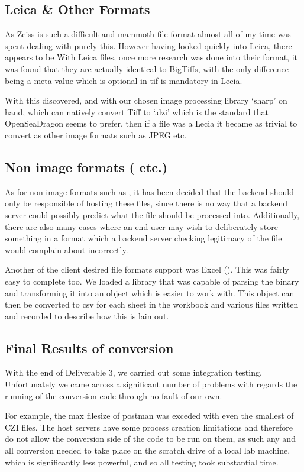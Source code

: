 \subsection{Leica \& Other Formats}
As Zeiss is such a difficult and mammoth file format almost all of my time was spent dealing with purely this.
However having looked quickly into Leica, there appears to be
With Leica files, once more research was done into their format, it was found that they are actually identical
to BigTiffs, with the only difference being a meta value which is optional in tif is mandatory in Lecia.

With this discovered, and with our chosen image processing library `sharp' on hand, which can natively convert Tiff to
`.dzi' which is the standard that OpenSeaDragon seems to prefer, then if a file was a Lecia it became as trivial to convert
as other image formats such as JPEG etc.

\subsection{Non image formats ( etc.)}
As for non image formats such as , it has been decided that the backend should only be responsible of hosting these
files, since there is no way that a backend server could possibly predict what the file should be processed into.
Additionally, there are also many cases where an end-user may wish to deliberately store something in a format
which a backend server checking legitimacy of the file would complain about incorrectly.

Another of the client desired file formats support was Excel (). This was fairly easy to complete too.
We loaded a library that was capable of parsing the binary and transforming it into an object which is easier to work with.
This object can then be converted to csv for each sheet in the workbook and various files written and recorded to describe
how this is lain out.

\subsection{Final Results of conversion}
With the end of Deliverable 3, we carried out some integration testing.
Unfortunately we came across a significant number of problems with regards the running of the conversion code through no fault of our own.

For example, the max filesize of postman was exceded with even the smallest of CZI files. The host servers have some process creation limitations
and therefore do not allow the conversion side of the code to be run on them, as such any and all conversion needed to take place on the
scratch drive of a local lab machine, which is significantly less powerful, and so all testing took substantial time.

